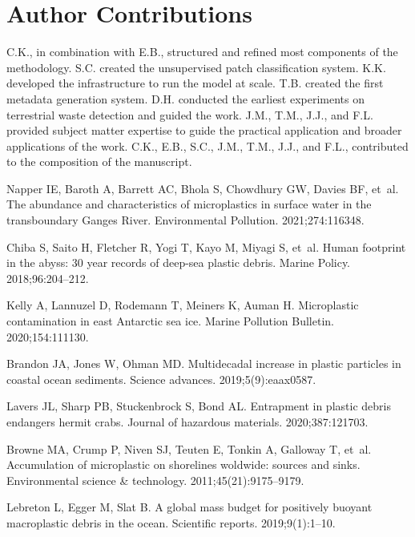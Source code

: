 \documentclass[10pt,letterpaper]{article}
\begin{document}
\section*{Author Contributions}
C.K., in combination with E.B., structured and refined most components of the methodology. S.C. created the unsupervised patch classification system. K.K. developed the infrastructure to run the model at scale. T.B. created the first metadata generation system. D.H. conducted the earliest experiments on terrestrial waste detection and guided the work. J.M., T.M., J.J., and F.L. provided subject matter expertise to guide the practical application and broader applications of the work. C.K., E.B., S.C., J.M., T.M., J.J., and F.L., contributed to the composition of the manuscript.

\nolinenumbers
\begin{thebibliography}{10}

Napper IE, Baroth A, Barrett AC, Bhola S, Chowdhury GW, Davies BF, et~al.
\newblock The abundance and characteristics of microplastics in surface water
  in the transboundary Ganges River.
\newblock Environmental Pollution. 2021;274:116348.

Chiba S, Saito H, Fletcher R, Yogi T, Kayo M, Miyagi S, et~al.
\newblock Human footprint in the abyss: 30 year records of deep-sea plastic
  debris.
\newblock Marine Policy. 2018;96:204--212.

Kelly A, Lannuzel D, Rodemann T, Meiners K, Auman H.
\newblock Microplastic contamination in east Antarctic sea ice.
\newblock Marine Pollution Bulletin. 2020;154:111130.

Brandon JA, Jones W, Ohman MD.
\newblock Multidecadal increase in plastic particles in coastal ocean
  sediments.
\newblock Science advances. 2019;5(9):eaax0587.

Lavers JL, Sharp PB, Stuckenbrock S, Bond AL.
\newblock Entrapment in plastic debris endangers hermit crabs.
\newblock Journal of hazardous materials. 2020;387:121703.

Browne MA, Crump P, Niven SJ, Teuten E, Tonkin A, Galloway T, et~al.
\newblock Accumulation of microplastic on shorelines woldwide: sources and
  sinks.
\newblock Environmental science \& technology. 2011;45(21):9175--9179.

Lebreton L, Egger M, Slat B.
\newblock A global mass budget for positively buoyant macroplastic debris in
  the ocean.
\newblock Scientific reports. 2019;9(1):1--10.


\end{thebibliography}
\end{document}
